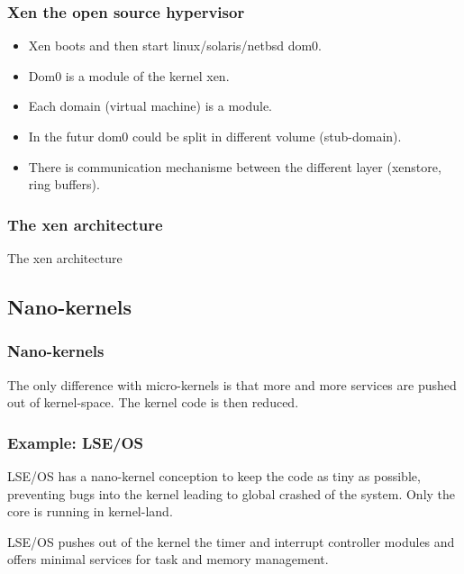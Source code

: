 \begin{frame}
        \frametitle{Xen the open source hypervisor}
        \begin{itemize}
                \item Xen boots and then start linux/solaris/netbsd dom0.
                \item Dom0 is a module of the kernel xen.
                \item Each domain (virtual machine) is a module.
                \item In the futur dom0 could be split in different
                volume (stub-domain).
                \item There is communication mechanisme between the
                different layer (xenstore, ring buffers).
        \end{itemize}
\end{frame}
\begin{frame}
\frametitle{The xen architecture}
\begin{center}


The xen architecture

\end{center}
\end{frame}

%
%

\subsection{Nano-kernels}

%
%

\begin{frame}
  \frametitle{Nano-kernels}

  The only difference with micro-kernels is that more and more
  services are pushed out of kernel-space. The kernel code is then
  reduced.

\end{frame}

%
%

\begin{frame}
  \frametitle{Example: LSE/OS}

  LSE/OS has a nano-kernel conception to keep the code as tiny as
  possible, preventing bugs into the kernel leading to global crashed
  of the system. Only the core is running in kernel-land.

  \begin{center}
  \end{center}

  LSE/OS pushes out of the kernel the timer and interrupt controller
  modules and offers minimal services for task and memory management.

\end{frame}


